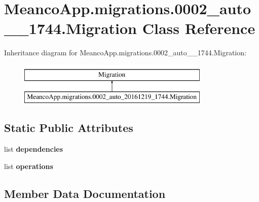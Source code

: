 \hypertarget{class_meanco_app_1_1migrations_1_10002__auto__20161219__1744_1_1_migration}{}\section{Meanco\+App.\+migrations.0002\+\_\+auto\+\_\+\_\+1744.Migration Class Reference}
\label{class_meanco_app_1_1migrations_1_10002__auto__20161219__1744_1_1_migration}
Inheritance diagram for Meanco\+App.\+migrations.0002\+\_\+auto\+\_\+\_\+1744.Migration\+:\begin{figure}[H]
\begin{center}
\leavevmode
\includegraphics[height=2.000000cm]{class_meanco_app_1_1migrations_1_10002__auto__20161219__1744_1_1_migration}
\end{center}
\end{figure}
\subsection*{Static Public Attributes}
\begin{DoxyCompactItemize}
\item 
list {\bfseries dependencies}
\item 
list {\bfseries operations}
\end{DoxyCompactItemize}


\subsection{Member Data Documentation}
\hypertarget{class_meanco_app_1_1migrations_1_10002__auto__20161219__1744_1_1_migration_a39f91e78a4bb92f35bef691d719011dc}{}\label{class_meanco_app_1_1migrations_1_10002__auto__20161219__1744_1_1_migration_a39f91e78a4bb92f35bef691d719011dc} 
